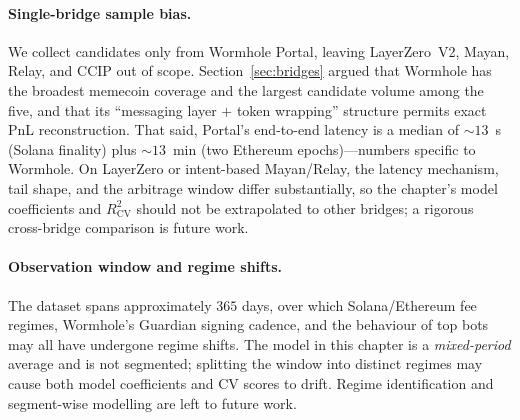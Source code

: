 \documentclass[sigconf,nonacm,10pt]{acmart}
\begin{document}
\paragraph{Single-bridge sample bias.} We collect candidates only
from Wormhole Portal, leaving LayerZero~V2, Mayan, Relay, and CCIP
out of scope.
Section~\ref{sec:bridges} argued that Wormhole has the broadest
memecoin coverage and the largest candidate volume among the five,
and that its ``messaging layer $+$ token wrapping'' structure permits
exact PnL reconstruction. That said, Portal's end-to-end latency
is a median of $\sim\!13$~s (Solana finality) plus $\sim\!13$~min
(two Ethereum epochs)---numbers specific to Wormhole. On LayerZero or
intent-based Mayan/Relay, the latency mechanism, tail shape, and the
arbitrage window differ substantially, so the chapter's model
coefficients and $R^2_{\text{CV}}$ should not be extrapolated to
other bridges; a rigorous cross-bridge comparison is future work.

\paragraph{Observation window and regime shifts.} The dataset spans
approximately $365$ days, over which Solana/Ethereum fee regimes,
Wormhole's Guardian signing cadence, and the behaviour of top bots
may all have undergone regime shifts. The model in this chapter is
a \emph{mixed-period} average and is not segmented; splitting the
window into distinct regimes may cause both model coefficients and
CV scores to drift. Regime identification and segment-wise modelling
are left to future work.
\end{document}
